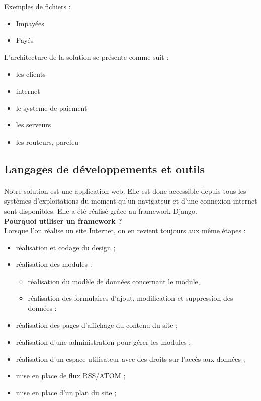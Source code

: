 	  	Exemples de fichiers :
	  	\begin{itemize}
		  \item Impay\'ees
		  \item Pay\'es
		\end{itemize}

	  		  	
	  	L'architecture de la solution se pr\'esente comme suit :
		\begin{itemize}
		  \item les clients
		  \item internet
		  \item le systeme de paiement
		  \item les serveurs
		  \item les routeurs, parefeu
		\end{itemize}

  \subsection{Langages de développements et outils}
  
      \paragraph{}
	  Notre solution est une application web. Elle est donc accessible depuis tous les systèmes d'exploitations du moment qu'un navigateur et d'une connexion internet sont disponibles. Elle a \'et\'e r\'ealis\'e gr\^ace au framework Django.\\
	  
	  \textbf{Pourquoi utiliser un framework ?}\\
	  Lorsque l'on réalise un site Internet, on en revient toujours aux même étapes :
	  \begin{itemize}
	    \item réalisation et codage du design ;
	    \item réalisation des modules :
	    \begin{itemize}
	      \item réalisation du modèle de données concernant le module,
	      \item réalisation des formulaires d'ajout, modification et suppression des données :
	    \end{itemize}
	    \item réalisation des pages d'affichage du contenu du site ;
	    \item réalisation d'une administration pour gérer les modules ;
	    \item réalisation d'un espace utilisateur avec des droits sur l'accès aux données ;
	    \item mise en place de flux RSS/ATOM ;
	    \item mise en place d'un plan du site ;
	  \end{itemize}
